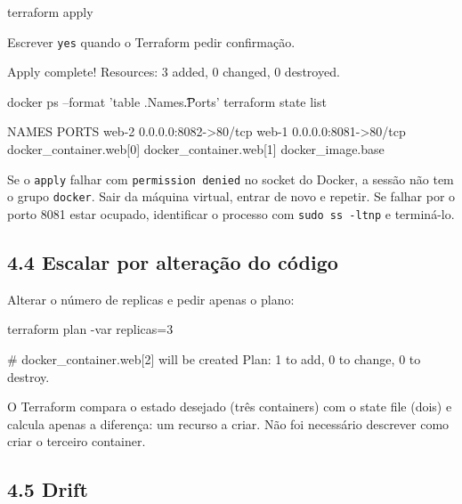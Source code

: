 \documentclass[11pt,a4paper]{article}
\newcommand{\cmd}[1]{\texttt{#1}}
\begin{document}
\begin{terminal}
terraform apply
\end{terminal}

Escrever \cmd{yes} quando o Terraform pedir confirmação.

\begin{saida}
Apply complete! Resources: 3 added, 0 changed, 0 destroyed.
\end{saida}

\begin{terminal}
docker ps --format 'table {{.Names}}\t{{.Ports}}'
terraform state list
\end{terminal}

\begin{saida}
NAMES   PORTS
web-2   0.0.0.0:8082->80/tcp
web-1   0.0.0.0:8081->80/tcp
docker_container.web[0]
docker_container.web[1]
docker_image.base
\end{saida}

\begin{erro}
Se o \cmd{apply} falhar com \cmd{permission denied} no socket do Docker, a sessão não tem o grupo \cmd{docker}. Sair da máquina virtual, entrar de novo e repetir. Se falhar por o porto 8081 estar ocupado, identificar o processo com \cmd{sudo ss -ltnp} e terminá-lo.
\end{erro}

\subsection*{4.4 Escalar por alteração do código}

Alterar o número de replicas e pedir apenas o plano:

\begin{terminal}
terraform plan -var replicas=3
\end{terminal}

\begin{saida}
  # docker_container.web[2] will be created
Plan: 1 to add, 0 to change, 0 to destroy.
\end{saida}

\begin{observe}
O Terraform compara o estado desejado (três containers) com o state file (dois) e calcula apenas a diferença: um recurso a criar. Não foi necessário descrever como criar o terceiro container.
\end{observe}

\subsection*{4.5 Drift}
\end{document}
